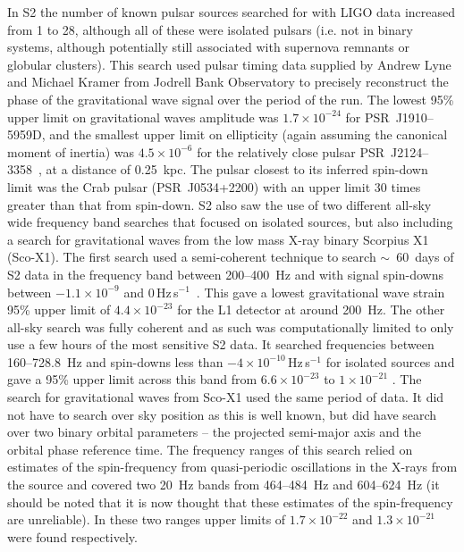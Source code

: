 \documentclass{article}
\begin{document}
In S2 the number of known pulsar sources searched for with LIGO data increased
from 1 to 28, although all of these were isolated pulsars (i.e. not in binary
systems, although potentially still associated with supernova remnants or
globular clusters). This search used pulsar timing data supplied by Andrew Lyne
and Michael Kramer from Jodrell Bank Observatory to precisely reconstruct the
phase of the gravitational wave signal over the period of the run. The lowest
95\% upper limit on gravitational waves amplitude was $1.7\times10^{-24}$ for
PSR~J1910--5959D, and the smallest upper limit on ellipticity (again assuming
the canonical moment of inertia) was $4.5\times10^{-6}$ for the relatively close
pulsar PSR~J2124--3358~\cite{Abbott:2005f}, at a distance of 0.25~kpc. The
pulsar closest to its inferred spin-down limit was the Crab pulsar
(PSR~J0534+2200) with an upper limit 30 times greater than that from spin-down.
S2 also saw the use of two different all-sky wide frequency band searches that
focused on isolated sources, but also including a search for gravitational waves
from the low mass X-ray binary Scorpius X1 (Sco-X1). The first search used a
semi-coherent technique to search $\sim$~60~days of S2 data in the frequency band
between 200--400~Hz and with signal spin-downs between $-1.1\times10^{-9}$ and
0\,Hz\,s$^{-1}$~\cite{Abbott:2005g}. This gave a lowest gravitational wave
strain 95\% upper limit of $4.4\times10^{-23}$ for the L1 detector at around
200~Hz. The other all-sky search was fully coherent and as such was
computationally limited to only use a few hours of the most sensitive S2 data.
It searched frequencies between 160--728.8~Hz and spin-downs less than
$-4\times10^{-10}$\,Hz\,s$^{-1}$ for isolated sources and gave a 95\% upper
limit across this band from $6.6\times10^{-23}$ to $1\times10^{-21}$
\cite{Abbott:2007a}. The search for gravitational waves from Sco-X1 used the
same period of data. It did not have to search over sky position as this is well
known, but did have search over two binary orbital parameters -- the projected
semi-major axis and the orbital phase reference time. The frequency ranges of
this search relied on estimates of the spin-frequency from quasi-periodic
oscillations in the X-rays from the source and covered two 20~Hz bands from
464--484~Hz and 604--624~Hz (it should be noted that it is now thought that
these estimates of the spin-frequency are unreliable). In these two ranges upper
limits of $1.7\times10^{-22}$ and $1.3\times10^{-21}$ were found respectively.
\end{document}

